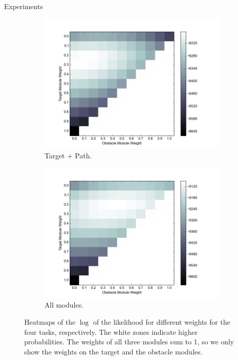 \documentclass[final]{beamer}
\begin{document}
\begin{frame}{}
\begin{textblock}{37}
\begin{block}{Experiments}
\begin{figure}[h]
\begin{subfigure}[b]{0.24\textwidth}
\includegraphics[width=\textwidth]{objValuesTask3.png}
\caption{Target + Path. }
\end{subfigure}
\begin{subfigure}[b]{0.24\textwidth}
\includegraphics[width=\textwidth]{objValuesTask4.png}
\caption{All modules. }
\end{subfigure}
\caption{Heatmaps of the $\log$ of the likelihood for
different weights for the four tasks, respectively. The white zones indicate
higher probabilities. The weights of all three modules sum to 1, so we only show
the weights on the target and the obstacle modules.
}
\label{fig:heatmap}
\end{figure}
\end{block}


\end{textblock}
\end{frame}
\end{document}
